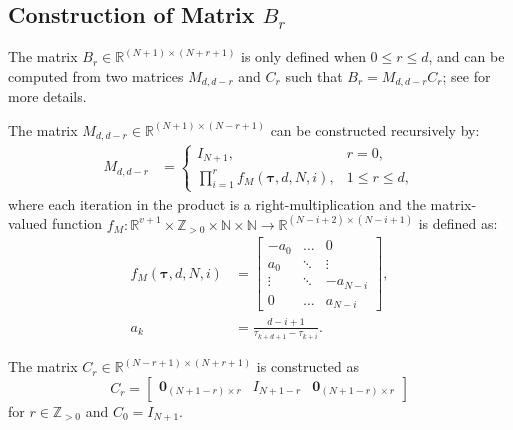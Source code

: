 \documentclass[journal,10pt]{IEEEtran}
\newcommand{\vect}[1]{\boldsymbol{\mathbf{#1}}}
\newcommand{\mat}[1]{\begin{bmatrix} #1 \end{bmatrix}}
\newcommand{\R}{\mathbb{R}}
\newif\ifdraft
\newcommand{\XX}[1]{\ifdraft{\color{red}[{\bf XX}: #1]}\fi}
\begin{document}




\appendix

\subsection{Construction of Matrix $B_r$}\label{B_mat}
The matrix $B_r\in\R^{(N+1)\times(N+r+1)}$ is only defined when $0\leq r\leq d$, and can be computed from two matrices $M_{d,d-r}$ and $C_r$ such that $B_r = M_{d,d-r}C_r$; see \cite{fajar_thesis} for more details. 

The matrix $M_{d,d-r}\in\R^{(N+1)\times(N-r+1)}$ can be constructed recursively by:
\begin{align*}
    M_{d,d-r} &= \begin{cases} I_{N+1},  & r= 0,\\
    \prod_{i=1}^rf_M(\vect{\tau},d,N,i), & 1\leq r \leq d,
    \end{cases}
\end{align*}
where each iteration in the product is a right-multiplication and the matrix-valued function $f_M: \mathbb{R}^{v+1}\times \mathbb{Z}_{>0}\times\mathbb{N}\times\mathbb{N} \rightarrow \mathbb{R}^{(N-i+2)\times(N-i+1)}$ is defined as:
\begin{align*}
    f_M(\vect{\tau},d,N,i) 
    & = \mat{-a_0 &\dots & 0\\
              a_0 & \ddots & \vdots\\
              \vdots &\ddots&-a_{N-i}\\
              0 & \hdots & a_{N-i}},\\
    a_k &= \frac{d-i+1}{\tau_{k+d+1}-\tau_{k+i}}.
\end{align*}
 
The matrix $C_r\in\R^{(N-r+1)\times(N+r+1)}$ is constructed as
    $$C_r = \mat{\vect{0}_{(N+1-r)\times r}& I_{N+1-r}& \vect{0}_{(N+1-r)\times r}}
    $$ 
for $r\in \mathbb{Z}_{>0}$ and $C_0=I_{N+1}$.
\end{document}
